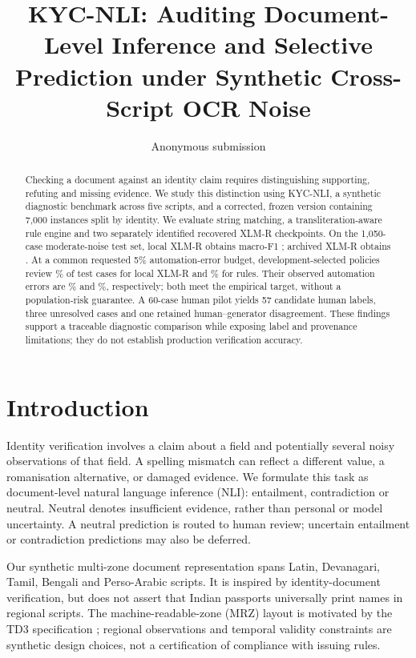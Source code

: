 \documentclass[11pt]{article}
\title{KYC-NLI: Auditing Document-Level Inference and Selective Prediction
under Synthetic Cross-Script OCR Noise}
\author{Anonymous submission}
\begin{document}
\maketitle
\begin{abstract}
Checking a document against an identity claim requires distinguishing supporting,
refuting and missing evidence. We study this distinction using KYC-NLI, a
synthetic diagnostic benchmark across five scripts, and a corrected, frozen
version containing 7,000 instances split by identity. We evaluate string
matching, a transliteration-aware rule engine and two separately identified
recovered XLM-R checkpoints. On the 1,050-case moderate-noise test set, local
XLM-R obtains macro-F1 \LocalFone{}; archived XLM-R obtains \ArchiveFone{}.
At a common requested 5\% automation-error budget, development-selected policies
review \LocalReview\% of test cases for local XLM-R and \RuleReview\% for rules.
Their observed automation errors are \LocalRisk\% and \RuleRisk\%, respectively;
both meet the empirical target, without a population-risk guarantee. A
60-case human pilot yields 57 candidate human labels, three unresolved cases
and one retained human--generator disagreement. These findings support a
traceable diagnostic comparison while exposing label and provenance limitations;
they do not establish production verification accuracy.
\end{abstract}

\section{Introduction}
Identity verification involves a claim about a field and potentially several
noisy observations of that field. A spelling mismatch can reflect a different
value, a romanisation alternative, or damaged evidence. We formulate this task
as document-level natural language inference (NLI): entailment, contradiction
or neutral. Neutral denotes insufficient evidence, rather than personal or
model uncertainty. A neutral prediction is routed to human review; uncertain
entailment or contradiction predictions may also be deferred.

Our synthetic multi-zone document representation spans Latin, Devanagari,
Tamil, Bengali and Perso-Arabic scripts. It is inspired by identity-document
verification, but does not assert that Indian passports universally print
names in regional scripts. The machine-readable-zone (MRZ) layout is motivated
by the TD3 specification \citep{icao9303}; regional observations and temporal
validity constraints are synthetic design choices, not a certification of
compliance with issuing rules.
\end{document}

